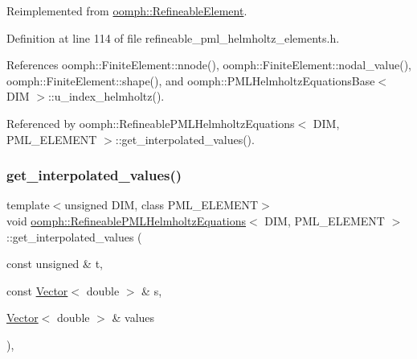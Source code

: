 Reimplemented from \hyperlink{classoomph_1_1RefineableElement_ad9a4f92880668a2373326d8306365c43}{oomph\+::\+Refineable\+Element}.



Definition at line 114 of file refineable\+\_\+pml\+\_\+helmholtz\+\_\+elements.\+h.



References oomph\+::\+Finite\+Element\+::nnode(), oomph\+::\+Finite\+Element\+::nodal\+\_\+value(), oomph\+::\+Finite\+Element\+::shape(), and oomph\+::\+P\+M\+L\+Helmholtz\+Equations\+Base$<$ D\+I\+M $>$\+::u\+\_\+index\+\_\+helmholtz().



Referenced by oomph\+::\+Refineable\+P\+M\+L\+Helmholtz\+Equations$<$ D\+I\+M, P\+M\+L\+\_\+\+E\+L\+E\+M\+E\+N\+T $>$\+::get\+\_\+interpolated\+\_\+values().

\mbox{\label{classoomph_1_1RefineablePMLHelmholtzEquations_a67107290248b8f9d921a24c1fca94e47}} 
\subsubsection{\texorpdfstring{get\+\_\+interpolated\+\_\+values()}{get\_interpolated\_values()}\hspace{0.1cm}{\footnotesize\ttfamily [2/2]}}
{\footnotesize\ttfamily template$<$unsigned D\+IM, class P\+M\+L\+\_\+\+E\+L\+E\+M\+E\+NT$>$ \\
void \hyperlink{classoomph_1_1RefineablePMLHelmholtzEquations}{oomph\+::\+Refineable\+P\+M\+L\+Helmholtz\+Equations}$<$ D\+IM, P\+M\+L\+\_\+\+E\+L\+E\+M\+E\+NT $>$\+::get\+\_\+interpolated\+\_\+values (\begin{DoxyParamCaption}\item[{const unsigned \&}]{t,  }\item[{const \hyperlink{classoomph_1_1Vector}{Vector}$<$ double $>$ \&}]{s,  }\item[{\hyperlink{classoomph_1_1Vector}{Vector}$<$ double $>$ \&}]{values }\end{DoxyParamCaption})\hspace{0.3cm}{\ttfamily [inline]}, {\ttfamily [virtual]}}



